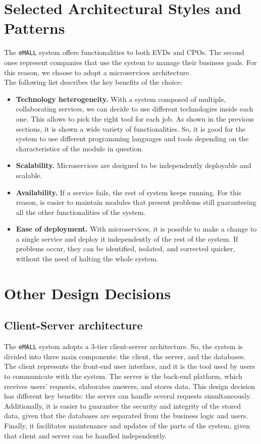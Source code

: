 \section{Selected Architectural Styles and Patterns}
\label{sec: patterns}%
The \verb|eMALL| system offers functionalities to both EVDs and CPOs.
The second ones represent companies that use the system to manage their business goals.
For this reason, we choose to adopt a microservices architecture. \\
The following list describes the key benefits of the choice:
\begin{itemize}
    \item \textbf{Technology heterogeneity.} With a system composed of multiple, collaborating services, we can decide to use different
    technologies inside each one.
    This allows to pick the right tool for each job.
    As shown in the previous sections, it is shown a wide variety of functionalities.
    So, it is good for the system to use different programming languages and tools depending on the characteristics of
    the module in question.
    \item \textbf{Scalability.} Microservices are designed to be independently deployable and scalable.
    \item \textbf{Availability.} If a service fails, the rest of system keeps running.
    For this reason, is easier to maintain modules that present problems still guaranteeing all the other functionalities
    of the system.
    \item \textbf{Ease of deployment.} With microservices, it is possible to make a change to a single service and deploy
    it independently of the rest of the system.
    If problems occur, they can be identified, isolated, and corrected quicker, without the need of halting the whole system.
\end{itemize}


\section{Other Design Decisions}
\label{sec: other_design_decisions}%

\subsection{Client-Server architecture}
\label{subsec:client_server_architecture}%
The \verb|eMALL| system adopts a 3-tier client-server architecture.
So, the system is divided into three main components: the client, the server, and the databases.
The client represents the front-end user interface, and it is the tool used by users to communicate with the system.
The server is the back-end platform, which receives users' requests, elaborates answers, and stores data.
This design decision has different key benefits: the server can handle several requests simultaneously.
Additionally, it is easier to guarantee the security and integrity of the stored data,
given that the databases are separated from the business logic and users.
Finally, it facilitates maintenance and updates of the parts of the system, given that client and server can be handled independently.

